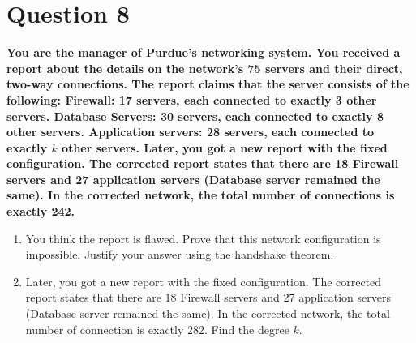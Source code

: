 \documentclass[11pt]{article}
\begin{document}
\clearpage
\section*{Question 8}

    \textbf{You are the manager of Purdue's networking system. You received a report about the details on the network's 75 servers and their direct, two-way connections. The report claims that the server consists of the following: Firewall: 17 servers, each connected to exactly 3 other servers. Database Servers: 30 servers, each connected to exactly 8 other servers. Application servers: 28 servers, each connected to exactly $k$ other servers. Later, you got a new report with the fixed configuration. The corrected report states that there are 18 Firewall servers and 27 application servers (Database server remained the same). In the corrected network, the total number of connections is exactly 242.}
    \begin{enumerate}[label=(\alph*)]
        \item You think the report is flawed. Prove that this network configuration is impossible. Justify your answer using the handshake theorem.
        \item Later, you got a new report with the fixed configuration. The corrected report states
that there are 18 Firewall servers and 27 application servers (Database server remained
the same). In the corrected network, the total number of connection is exactly 282.
Find the degree $k$.
    \end{enumerate}
\end{document}

